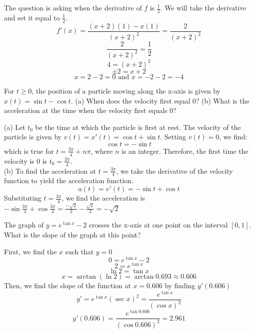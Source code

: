 \begin{Answer}
    [ref=deriv_rules6]
    The question is asking when the derivative of $f$ is $\frac{1}{2}$.
     We will take the derivative and set it equal to $\frac{1}{2}$. 
     $$f'(x) = \frac{(x + 2)(1) - x(1)}{(x + 2)^2}=\frac{2}{(x + 2)^2}$$
    $$\frac{2}{(x + 2)^2}=\frac{1}{2}$$
    $$4=(x + 2)^2$$
    $$\pm 2 = x + 2$$
    $$x= 2 - 2 = 0 \text{ and } x = -2 - 2 = -4$$
\end{Answer}

\begin{Exercise}
    [label=deriv_rules7]
    For $t \geq 0$, the position of a particle moving along the x-axis 
    is given by $x(t) = \sin{t} - \cos{t}$. (a) When does the velocity 
    first equal $0$? (b) What is the acceleration at the time when the 
    velocity first equals $0$?
\end{Exercise}

\begin{Answer}
    [ref=deriv_rules7]
    (a) Let $t_0$ be the time at which the particle is first at rest. 
    The velocity of the particle is given by $v(t) = x'(t) = \cos{t} 
    + \sin{t}$. Setting $v(t) = 0$, we find:
    $$\cos{t} = -\sin{t}$$ 
    which is true for $t = \frac{3\pi}{4} + n\pi$, where $n$ is an 
    integer. Therefore, the first time the velocity is $0$ is $t_0 = 
    \frac{3\pi}{4}$. \\
    (b) To find the acceleration at $t=\frac{3\pi}{4}$, we take the 
    derivative of the velocity function to yield the acceleration 
    function. $$a(t) = v'(t) = -\sin{t} + \cos{t}$$ Substituting $t =
    \frac{3\pi}{4}$, we find the acceleration is $-\sin{\frac{3\pi}{4}}
     + \cos{\frac{3\pi}{4}} = \frac{-\sqrt{2}}{2} - \frac{\sqrt{2}}{2} 
     = -\sqrt{2}$
\end{Answer}

\begin{Exercise}
    [label=deriv_rules8]
    The graph of $y=e^{\tan{x}} - 2$ crosses the x-axis at one point 
    on the interval $[0, 1]$. What is the slope of the graph at this 
    point?
\end{Exercise}

\begin{Answer}
    [ref=deriv_rules8]
    First, we find the $x$ such that $y = 0$ 
    $$0 = e^{\tan{x}} - 2$$ 
    $$2 = e^{\tan{x}}$$ $$\ln{2} = \tan{x}$$ 
    $$x=\arctan{(\ln{2})} = \arctan{0.693} \approx 0.606$$
    Then, we find the slope of the function at $x=0.606$ by finding 
    $y'(0.606)$ 
    $$y'=e^{\tan{x}}(\sec{x})^2  = \frac{e^{\tan{x}}}{(\cos{x})^2}$$
    $$y'(0.606) = \frac{e^{\tan{0.606}}}{(\cos{0.606})^2} = 2.961$$
\end{Answer}

